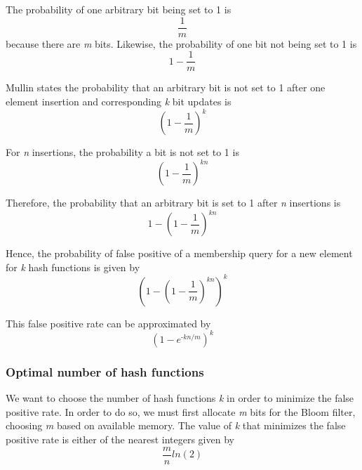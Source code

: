 The probability of one arbitrary bit being set to 1 is
\begin{equation}
    \frac{1}{m}
\end{equation}
because there are \textit{m} bits. Likewise, the probability of one bit not being set to 1 is
\begin{equation}
    1-\frac{1}{m}
\end{equation}

Mullin states the probability that an arbitrary bit is not set to 1 after one element insertion and corresponding \textit{k} bit updates is
\begin{equation}
    (1-\frac{1}{m})^\textit{k}
\end{equation}

For \textit{n} insertions, the probability a bit is not set to 1 is
\begin{equation}
    (1-\frac{1}{m})^\textit{kn}
\end{equation}

Therefore, the probability that an arbitrary bit is set to 1 after \textit{n} insertions is 
\begin{equation}
    1-(1-\frac{1}{m})^\textit{kn}
\end{equation}

Hence, the probability of false positive of a membership query for a new element for \textit{k} hash functions is given by
\begin{equation}
    (1-(1-\frac{1}{m})^\textit{kn})^\textit{k}
\end{equation}

This false positive rate can be approximated by 
\begin{equation}
    (1-e^\textit{-kn/m})^\textit{k}
\end{equation}


\subsubsection*{Optimal number of hash functions}
We want to choose the number of hash functions \textit{k} in order to minimize the false positive rate. In order to do so, we must first allocate \textit{m} bits for the Bloom filter, choosing \textit{m} based on available memory. The value of \textit{k} that minimizes the false positive rate is either of the nearest integers given by
\begin{equation}
    \frac{m}{n}ln(2)
\end{equation}

